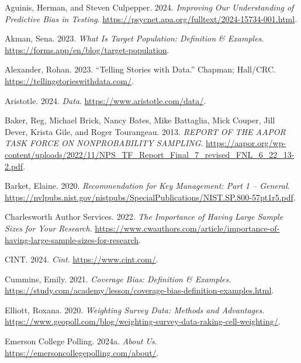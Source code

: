 \documentclass[
  letterpaper,
  DIV=11,
  numbers=noendperiod]{scrartcl}
\newlength{\cslhangindent}
\newlength{\cslentryspacingunit} %
\newenvironment{CSLReferences}[2] %
 {%
  \setlength{\parindent}{0pt}
  \ifodd #1
  \let\oldpar\par
  \def\par{\hangindent=\cslhangindent\oldpar}
  \fi
  \setlength{\parskip}{#2\cslentryspacingunit}
 }%
 {}
\begin{document}
\hypertarget{refs}{}
\begin{CSLReferences}{1}{0}
\leavevmode{}%
Aguinis, Herman, and Steven Culpepper. 2024. \emph{Improving Our
Understanding of Predictive Bias in Testing}.
\url{https://psycnet.apa.org/fulltext/2024-15734-001.html}.

\leavevmode{}%
Akman, Sena. 2023. \emph{What Is Target Population: Definition \&
Examples}. \url{https://forms.app/en/blog/target-population}.

\leavevmode{}%
Alexander, Rohan. 2023. {``Telling Stories with Data.''} Chapman;
Hall/CRC. \url{https://tellingstorieswithdata.com/}.

\leavevmode{}%
Aristotle. 2024. \emph{Data}. \url{https://www.aristotle.com/data/}.

\leavevmode{}%
Baker, Reg, Michael Brick, Nancy Bates, Mike Battaglia, Mick Couper,
Jill Dever, Krista Gile, and Roger Tourangeau. 2013. \emph{REPORT OF THE
AAPOR TASK FORCE ON NONPROBABILITY SAMPLING}.
\url{https://aapor.org/wp-content/uploads/2022/11/NPS_TF_Report_Final_7_revised_FNL_6_22_13-2.pdf}.

\leavevmode{}%
Barket, Elaine. 2020. \emph{Recommendation for Key Management: Part 1 --
General}.
\url{https://nvlpubs.nist.gov/nistpubs/SpecialPublications/NIST.SP.800-57pt1r5.pdf}.

\leavevmode{}%
Charlesworth Author Services. 2022. \emph{The Importance of Having Large
Sample Sizes for Your Research}.
\url{https://www.cwauthors.com/article/importance-of-having-large-sample-sizes-for-research}.

\leavevmode{}%
CINT. 2024. \emph{Cint}. \url{https://www.cint.com/}.

\leavevmode{}%
Cummins, Emily. 2021. \emph{Coverage Bias: Definition \& Examples}.
\url{https://study.com/academy/lesson/coverage-bias-definition-examples.html}.

\leavevmode{}%
Elliott, Roxana. 2020. \emph{Weighting Survey Data: Methods and
Advantages}.
\url{https://www.geopoll.com/blog/weighting-survey-data-raking-cell-weighting/}.

\leavevmode{}%
Emerson College Polling. 2024a. \emph{About Us}.
\url{https://emersoncollegepolling.com/about/}.


\end{CSLReferences}
\end{document}
